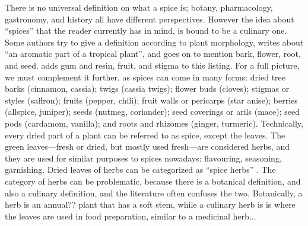 There is no universal definition on what a spice is; botany, pharmacology, gastronomy, and history all have different perspectives. However the idea about ``spices'' that the reader currently has in mind, is bound to be a culinary one. Some authors try to give a definition according to plant morphology, \textcite[9]{czarra_spices_2009} writes about ``an aromatic part of a tropical plant'', and goes on to mention bark, flower, root, and seed. \textcite[xix]{turner_spice_2004} adds gum and resin, fruit, and stigma to this listing. For a full picture, we must complement it further, as spices can come in many forms: dried tree barks (cinnamon, cassia); twigs
(cassia twigs); flower buds (cloves); stigmas or styles (saffron); fruits (pepper, chili); fruit walls or pericarps (star anise); berries (allspice, juniper); seeds (nutmeg, coriander); seed coverings or arils (mace); seed pods (cardamom, vanilla); and roots and rhizomes (ginger, turmeric). Technically, every dried part of a plant can be referred to as spice, except the leaves. The green leaves---fresh or dried, but mostly used fresh---are considered herbs, and they are used for similar purposes to spices nowadays: flavouring, seasoning, garnishing. Dried leaves of herbs can be categorized as ``spice herbs'' \parencite[see][]{van_wyk_culinary_2014}. The category of herbs can be problematic, because there is a botanical definition, and also a culinary definition, and the literature often confuses the two. Botanically, a herb is an annual?? plant that has a soft stem, while a culinary herb is is where the leaves are used in food preparation, similar to a medicinal herb...

